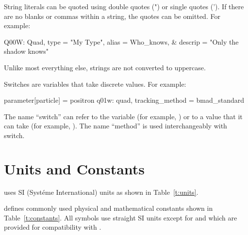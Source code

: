 {{
String literals can be quoted using double quotes (") or single quotes ('). 
If there are no
blanks or commas within a string, the quotes can be omitted. For example:
\begin{example}
  Q00W: Quad, type = "My Type", alias = Who_knows, &
                                  descrip = "Only the shadow knows"
\end{example}
Unlike most everything else, strings are not converted to uppercase.

Switches are variables that take discrete values. For example:
\begin{example}
  parameter[particle] = positron          
  q01w: quad, tracking_method = bmad_standard 
\end{example}
The name ``switch'' can refer to the variable (for example,
) or to a value that it can take (for example,
). The name ``method'' is used interchangeably with switch.

\section{Units and Constants}
\label{s:constants}

\bmad uses SI (Syst\'eme International) units as shown in
Table~\ref{t:units}.

\bmad defines commonly used physical and mathematical constants
shown in Table~\ref{t:constants}.  All symbols use straight SI units
except for  and  which are provided for
compatibility with \mad.

}}
